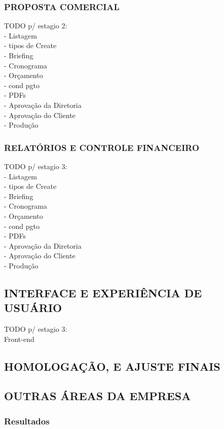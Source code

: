 \documentclass[
  12pt,				%
  openany,
  oneside,
  a4paper,			%
  english,			%
  brazil
]{article}
\numberwithin{figure}{section}
\numberwithin{table}{section}
\begin{document}
  
  \subsubsection{PROPOSTA COMERCIAL}
  \noindent TODO p/ estagio 2: \\
  - Listagem \\
  - tipos de Create \\
  - Briefing \\
  - Cronograma \\
  - Orçamento \\
  - cond pgto \\
  - PDFs \\
  - Aprovação da Diretoria \\
  - Aprovação do Cliente \\
  - Produção
  
    
  \subsubsection{RELATÓRIOS E CONTROLE FINANCEIRO}
  \noindent TODO p/ estagio 3: \\
  - Listagem \\
  - tipos de Create \\
  - Briefing \\
  - Cronograma \\
  - Orçamento \\
  - cond pgto \\
  - PDFs \\
  - Aprovação da Diretoria \\
  - Aprovação do Cliente \\
  - Produção


\subsection{INTERFACE E EXPERIÊNCIA DE USUÁRIO}
  \noindent TODO p/ estagio 3: \\
  Front-end


\subsection{HOMOLOGAÇÃO, E AJUSTE FINAIS}

\subsection{OUTRAS ÁREAS DA EMPRESA}

\subsubsection{Resultados}
\end{document}
